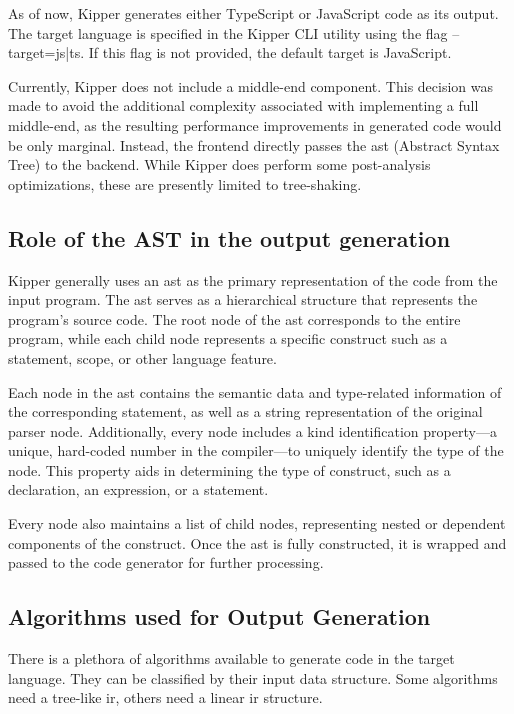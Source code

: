 As of now, Kipper generates either TypeScript or JavaScript code as its output. The target language is specified in the Kipper CLI utility using the flag --target={js|ts}. If this flag is not provided, the default target is JavaScript.

Currently, Kipper does not include a middle-end component. This decision was made to avoid the additional complexity associated with implementing a full middle-end, as the resulting performance improvements in generated code would be only marginal. Instead, the frontend directly passes the \acrshort{ast} (Abstract Syntax Tree) to the backend. While Kipper does perform some post-analysis optimizations, these are presently limited to tree-shaking.

\subsection{Role of the AST in the output generation}

Kipper generally uses an \acrshort{ast} as the primary representation of the code from the input program. The \acrshort{ast} serves as a hierarchical structure that represents the program's source code. The root node of the \acrshort{ast} corresponds to the entire program, while each child node represents a specific construct such as a statement, scope, or other language feature.

Each node in the \acrshort{ast} contains the semantic data and type-related information of the corresponding statement, as well as a string representation of the original parser node. Additionally, every node includes a kind identification property—a unique, hard-coded number in the compiler—to uniquely identify the type of the node. This property aids in determining the type of construct, such as a declaration, an expression, or a statement.

Every node also maintains a list of child nodes, representing nested or dependent components of the construct. Once the \acrshort{ast} is fully constructed, it is wrapped and passed to the code generator for further processing.

\subsection{Algorithms used for Output Generation}

There is a plethora of algorithms available to generate code in the target language. They can be classified by their input data structure. Some algorithms need a tree-like \acrshort{ir}, others need a linear \acrshort{ir} structure.

